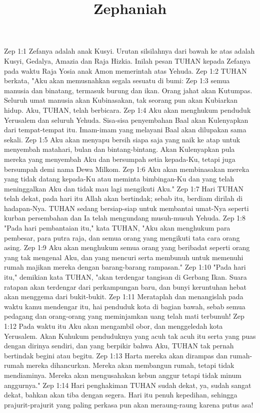 

\title{Zephaniah}

Zep 1:1  Zefanya adalah anak Kusyi. Urutan silsilahnya dari bawah ke atas adalah Kusyi, Gedalya, Amazia dan Raja Hizkia. Inilah pesan TUHAN kepada Zefanya pada waktu Raja Yosia anak Amon memerintah atas Yehuda.
Zep 1:2  TUHAN berkata, "Aku akan memusnahkan segala sesuatu di bumi:
Zep 1:3  semua manusia dan binatang, termasuk burung dan ikan. Orang jahat akan Kutumpas. Seluruh umat manusia akan Kubinasakan, tak seorang pun akan Kubiarkan hidup. Aku, TUHAN, telah berbicara.
Zep 1:4  Aku akan menghukum penduduk Yerusalem dan seluruh Yehuda. Sisa-sisa penyembahan Baal akan Kulenyapkan dari tempat-tempat itu. Imam-imam yang melayani Baal akan dilupakan sama sekali.
Zep 1:5  Aku akan menyapu bersih siapa saja yang naik ke atap untuk menyembah matahari, bulan dan bintang-bintang. Akan Kulenyapkan pula mereka yang menyembah Aku dan bersumpah setia kepada-Ku, tetapi juga bersumpah demi nama Dewa Milkom.
Zep 1:6  Aku akan membinasakan mereka yang tidak datang kepada-Ku atau meminta bimbingan-Ku dan yang telah meninggalkan Aku dan tidak mau lagi mengikuti Aku."
Zep 1:7  Hari TUHAN telah dekat, pada hari itu Allah akan bertindak; sebab itu, berdiam dirilah di hadapan-Nya. TUHAN sedang bersiap-siap untuk membantai umat-Nya seperti kurban persembahan dan Ia telah mengundang musuh-musuh Yehuda.
Zep 1:8  "Pada hari pembantaian itu," kata TUHAN, "Aku akan menghukum para pembesar, para putra raja, dan semua orang yang mengikuti tata cara orang asing.
Zep 1:9  Aku akan menghukum semua orang yang beribadat seperti orang yang tak mengenal Aku, dan yang mencuri serta membunuh untuk memenuhi rumah majikan mereka dengan barang-barang rampasan."
Zep 1:10  "Pada hari itu," demikian kata TUHAN, "akan terdengar tangisan di Gerbang Ikan. Suara ratapan akan terdengar dari perkampungan baru, dan bunyi keruntuhan hebat akan menggema dari bukit-bukit.
Zep 1:11  Merataplah dan menangislah pada waktu kamu mendengar itu, hai penduduk kota di bagian bawah, sebab semua pedagang dan orang-orang yang meminjamkan uang telah mati terbunuh!
Zep 1:12  Pada waktu itu Aku akan mengambil obor, dan menggeledah kota Yerusalem. Akan Kuhukum penduduknya yang acuh tak acuh itu serta yang puas dengan dirinya sendiri, dan yang berpikir bahwa Aku, TUHAN tak pernah bertindak begini atau begitu.
Zep 1:13  Harta mereka akan dirampas dan rumah-rumah mereka dihancurkan. Mereka akan membangun rumah, tetapi tidak mendiaminya. Mereka akan mengusahakan kebun anggur tetapi tidak minum anggurnya."
Zep 1:14  Hari penghakiman TUHAN sudah dekat, ya, sudah sangat dekat, bahkan akan tiba dengan segera. Hari itu penuh kepedihan, sehingga prajurit-prajurit yang paling perkasa pun akan meraung-raung karena putus asa!
